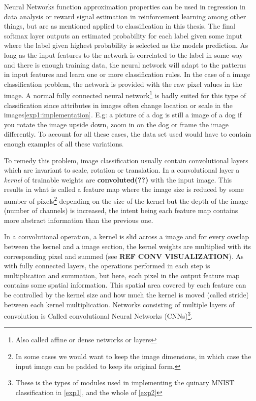 Neural Networks function approximation properties can be used in regression in data analysis or reward signal estimation in reinforcement learning among other things, but are as mentioned applied to classification in this thesis. 
The final softmax layer outputs an estimated probability for each label given some input where the label given highest probability is selected as the models prediction. As long as the input features to the network is correlated to the label in some way and there is enough training data, the neural network will adapt to the patterns in input features and learn one or more classification rules. In the case of a image classification problem, the network is provided with the raw pixel values in the image. A normal fully connected neural network\footnote{Also called affine or dense networks or layers} is badly suited for this type of classification since attributes in images often change location or scale in the images\ref{exp1:implementation}. E.g: a picture of a dog is still a image of a dog if you rotate the image upside down, zoom in on the dog or frame the image differently. To account for all these cases, the data set used would have to contain enough examples of all these variations.

To remedy this problem, image classification usually contain convolutional layers which are invariant to scale, rotation or translation. In a convolutional layer a \textit{kernel} of trainable weights are \textbf{convoluted(??)} with the input image. This results in what is called a feature map where the image size is reduced by some number of pixels\footnote{In some cases we would want to keep the image dimensions, in which case the input image can be padded to keep its original form.} depending on the size of the kernel but the depth of the image (number of channels) is increased, the intent being each feature map contains more abstract information than the previous one. 

In a convolutional operation, a kernel is slid across a image and for every overlap between the kernel and a image section, the kernel weights are multiplied with its corresponding pixel and summed (see \textbf{REF CONV VISUALIZATION}). As with fully connected layers, the operations performed in each step is multiplication and summation, but here, each pixel in the output feature map contains some spatial information.
This spatial area covered by each feature can be controlled by the kernel size and how much the kernel is moved (called stride) between each kernel multiplication.
Networks consisting of multiple layers of convolution is Called convolutional Neural Networks (CNNs)\footnote{These is the types of modules used in implementing the quinary MNIST classification in \ref{exp1}, and the whole of \ref{exp2}}.

